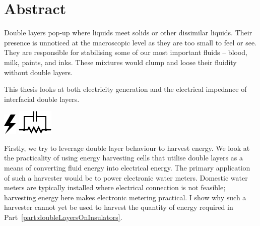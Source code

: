 





\rmfamily


\chapter*{Abstract}
  Double layers pop-up where liquids meet solids or other dissimilar liquids.
  Their presence is unnoticed at the macroscopic level as they are too small to feel or see.
  They are responsible for stabilising some of our most important fluids -- blood, milk, paints, and inks.
  These mixtures would clump and loose their fluidity without double layers.

  \vspace{-0.3cm}
  \begin{center}
    \parbox{8.8cm}{
      \begin{center}
        This thesis looks at both electricity generation and the electrical impedance of interfacial double layers.
      \end{center}
      \vspace{-1.35cm}
    }
    \vspace{-0.3cm}
    \parbox{15cm}{
        \hspace{0.8cm}
        \hbox{\vspace{-0.9cm}\includegraphics{graphics/logo_electricity}}
        \hbox{\hspace{9.8cm}\includegraphics{graphics/logo_impedance}}
    }
  \end{center}
  \vspace{0.5cm}

  Firstly, we try to leverage double layer behaviour to harvest energy.
  We look at the practicality of using energy harvesting cells that utilise double layers as a means of converting fluid energy into electrical energy.
  The primary application of such a harvester would be to power electronic water meters.
  Domestic water meters are typically installed where electrical connection is not feasible; harvesting energy here makes electronic metering practical.
  I show why such a harvester cannot yet be used to harvest the quantity of energy required in Part~\ref{part:doubleLayersOnInsulators}.

